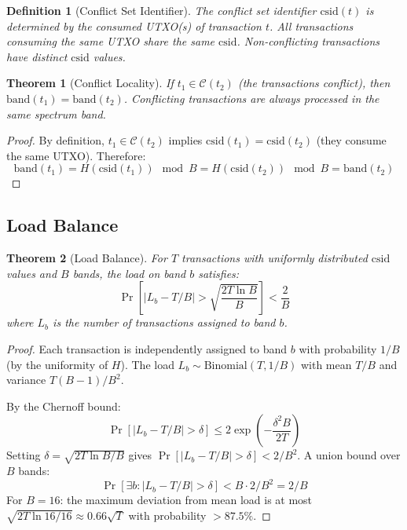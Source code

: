\documentclass[11pt,a4paper]{article}
\newtheorem{theorem}{Theorem}[section]
\newtheorem{definition}{Definition}[section]
\begin{document}
\begin{definition}[Conflict Set Identifier]
The conflict set identifier $\text{csid}(t)$ is determined by the consumed UTXO(s)
of transaction $t$. All transactions consuming the same UTXO share the same $\text{csid}$.
Non-conflicting transactions have distinct $\text{csid}$ values.
\end{definition}

\begin{theorem}[Conflict Locality]
\label{thm:locality}
If $t_1 \in \mathcal{C}(t_2)$ (the transactions conflict), then $\text{band}(t_1) = \text{band}(t_2)$.
Conflicting transactions are always processed in the same spectrum band.
\end{theorem}

\begin{proof}
By definition, $t_1 \in \mathcal{C}(t_2)$ implies $\text{csid}(t_1) = \text{csid}(t_2)$
(they consume the same UTXO). Therefore:
\[
\text{band}(t_1) = H(\text{csid}(t_1)) \mod B = H(\text{csid}(t_2)) \mod B = \text{band}(t_2)
\]
\end{proof}

\subsection{Load Balance}

\begin{theorem}[Load Balance]
\label{thm:balance}
For $T$ transactions with uniformly distributed $\text{csid}$ values and $B$ bands,
the load on band $b$ satisfies:
\[
\Pr\left[|L_b - T/B| > \sqrt{\frac{2T \ln B}{B}}\right] < \frac{2}{B}
\]
where $L_b$ is the number of transactions assigned to band $b$.
\end{theorem}

\begin{proof}
Each transaction is independently assigned to band $b$ with probability $1/B$ (by
the uniformity of $H$). The load $L_b \sim \text{Binomial}(T, 1/B)$ with mean $T/B$
and variance $T(B-1)/B^2$.

By the Chernoff bound:
\[
\Pr[|L_b - T/B| > \delta] \leq 2\exp\left(-\frac{\delta^2 B}{2T}\right)
\]
Setting $\delta = \sqrt{2T \ln B / B}$ gives $\Pr[|L_b - T/B| > \delta] < 2/B^2$.
A union bound over $B$ bands:
\[
\Pr[\exists b : |L_b - T/B| > \delta] < B \cdot 2/B^2 = 2/B
\]
For $B = 16$: the maximum deviation from mean load is at most $\sqrt{2T \ln 16 / 16} \approx 0.66\sqrt{T}$
with probability $> 87.5\%$.
\end{proof}
\end{document}
